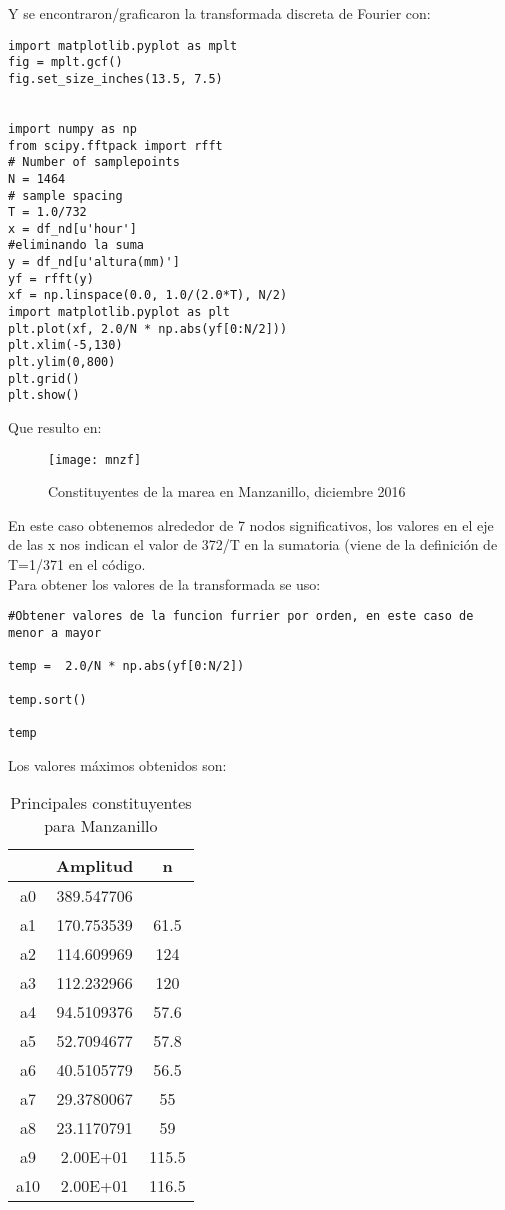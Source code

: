 \documentclass[12pt,letterpaper]{article}
\begin{document}
Y se encontraron/graficaron la transformada discreta de Fourier con:

\begin{verbatim}
import matplotlib.pyplot as mplt
fig = mplt.gcf()
fig.set_size_inches(13.5, 7.5)


import numpy as np
from scipy.fftpack import rfft
# Number of samplepoints
N = 1464
# sample spacing
T = 1.0/732
x = df_nd[u'hour']
#eliminando la suma
y = df_nd[u'altura(mm)']
yf = rfft(y)
xf = np.linspace(0.0, 1.0/(2.0*T), N/2)
import matplotlib.pyplot as plt
plt.plot(xf, 2.0/N * np.abs(yf[0:N/2]))
plt.xlim(-5,130)
plt.ylim(0,800)
plt.grid()
plt.show()
\end{verbatim}

Que resulto en:
\begin{figure}[H]
	\centering	\texttt{[image: mnzf]}
	\caption{Constituyentes de la marea en Manzanillo, diciembre 2016}
\end{figure}

En este caso obtenemos alrededor de 7 nodos significativos, los valores en el eje de las x nos indican el valor de 372/T en la sumatoria (viene de la definición de T=1/371 en el código.\\
Para obtener los valores de la transformada se uso:

\begin{verbatim}
#Obtener valores de la funcion furrier por orden, en este caso de menor a mayor

temp =  2.0/N * np.abs(yf[0:N/2])
 
temp.sort()

temp
\end{verbatim}


Los valores máximos obtenidos son:

\begin{table}[H]
\centering
\begin{tabular}{|c|c c|}
\hline
	&	Amplitud	&	n	\\
    \hline
a0	&	389.547706	&		\\
a1	&	170.753539	&	61.5	\\
a2	&	114.609969	&	124	\\
a3	&	112.232966	&	120	\\
a4	&	94.5109376	&	57.6	\\
a5	&	52.7094677	&	57.8	\\
a6	&	40.5105779	&	56.5	\\
a7	&	29.3780067	&	55	\\
a8	&	23.1170791	&	59	\\
a9	&	2.00E+01	&	115.5	\\
a10	&	2.00E+01	&	116.5	\\

\hline
\end{tabular}
\caption{Principales constituyentes para Manzanillo}
\end{table}
\end{document}
